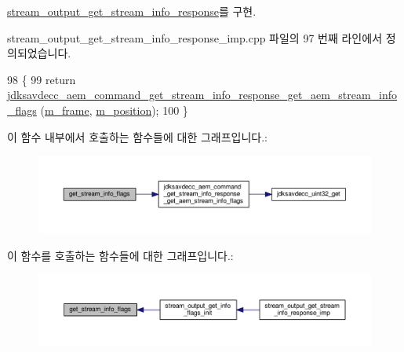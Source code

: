 \hyperlink{classavdecc__lib_1_1stream__output__get__stream__info__response_a24ae25b3a229f07ea76104024141ca84}{stream\+\_\+output\+\_\+get\+\_\+stream\+\_\+info\+\_\+response}를 구현.



stream\+\_\+output\+\_\+get\+\_\+stream\+\_\+info\+\_\+response\+\_\+imp.\+cpp 파일의 97 번째 라인에서 정의되었습니다.


\begin{DoxyCode}
98 \{
99     \textcolor{keywordflow}{return} 
      \hyperlink{group__command__get__stream__info__response_gaf959298de474d121f4c6b2e89e6c1a34}{jdksavdecc\_aem\_command\_get\_stream\_info\_response\_get\_aem\_stream\_info\_flags}
      (\hyperlink{classavdecc__lib_1_1stream__output__get__stream__info__response__imp_a50417969cf438e7c8d698726bbbe2ff9}{m\_frame}, \hyperlink{classavdecc__lib_1_1stream__output__get__stream__info__response__imp_af5e691c4a8a0feb07f48440b321206cd}{m\_position});
100 \}
\end{DoxyCode}


이 함수 내부에서 호출하는 함수들에 대한 그래프입니다.\+:
\nopagebreak
\begin{figure}[H]
\begin{center}
\leavevmode
\includegraphics[width=350pt]{classavdecc__lib_1_1stream__output__get__stream__info__response__imp_a7694ef99f2af4fac732fa2a5128a862d_cgraph}
\end{center}
\end{figure}




이 함수를 호출하는 함수들에 대한 그래프입니다.\+:
\nopagebreak
\begin{figure}[H]
\begin{center}
\leavevmode
\includegraphics[width=350pt]{classavdecc__lib_1_1stream__output__get__stream__info__response__imp_a7694ef99f2af4fac732fa2a5128a862d_icgraph}
\end{center}
\end{figure}


